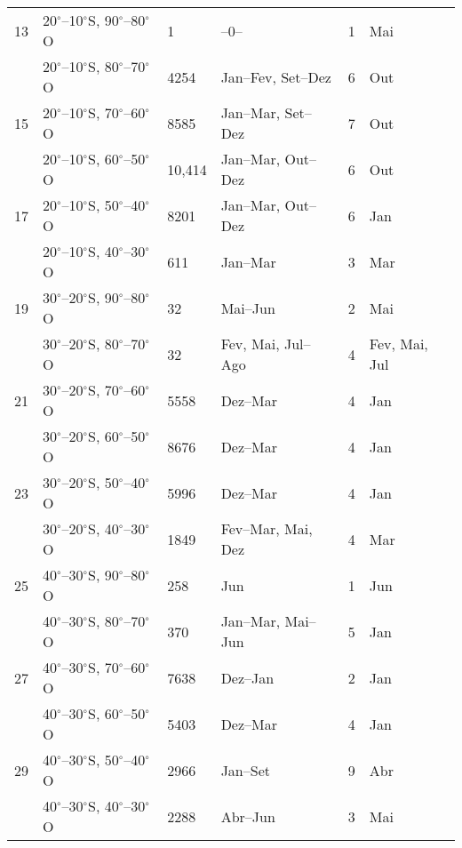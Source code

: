 \begin{table}[!ht]
\begin{tabularx}{\textwidth}{p{0.6cm} p{3.5cm} W W W W}
13&20$^{\circ}$--10$^{\circ}$S, 90$^{\circ}$--80$^{\circ}$O& 1  &   --0--  & 1 & Mai \\[1.5pt]&20$^{\circ}$--10$^{\circ}$S, 80$^{\circ}$--70$^{\circ}$O& 4254 & Jan--Fev,  Set--Dez  &6& Out\\[1.5pt]
15&20$^{\circ}$--10$^{\circ}$S, 70$^{\circ}$--60$^{\circ}$O& 8585 & Jan--Mar, Set--Dez &7& Out\\[1.5pt]&20$^{\circ}$--10$^{\circ}$S, 60$^{\circ}$--50$^{\circ}$O& 10,414 & Jan--Mar,  Out--Dez &6& Out\\[1.5pt]
17&20$^{\circ}$--10$^{\circ}$S, 50$^{\circ}$--40$^{\circ}$O& 8201 & Jan--Mar, Out--Dez &6&  Jan\\[1.5pt]&20$^{\circ}$--10$^{\circ}$S, 40$^{\circ}$--30$^{\circ}$O& 611 & Jan--Mar &3&  Mar\\[1.5pt]

19&30$^{\circ}$--20$^{\circ}$S, 90$^{\circ}$--80$^{\circ}$O& 32 & Mai--Jun &2&  Mai\\[1.5pt]&30$^{\circ}$--20$^{\circ}$S, 80$^{\circ}$--70$^{\circ}$O& 32 & Fev, Mai, Jul--Ago &4&  Fev, Mai,  Jul\\[1.5pt]
21&30$^{\circ}$--20$^{\circ}$S, 70$^{\circ}$--60$^{\circ}$O& 5558 & Dez--Mar &4& Jan\\[1.5pt]&30$^{\circ}$--20$^{\circ}$S, 60$^{\circ}$--50$^{\circ}$O& 8676 & Dez--Mar &4& Jan\\[1.5pt]
23&30$^{\circ}$--20$^{\circ}$S, 50$^{\circ}$--40$^{\circ}$O& 5996 & Dez--Mar &4& Jan\\[1.5pt]&30$^{\circ}$--20$^{\circ}$S, 40$^{\circ}$--30$^{\circ}$O& 1849 & Fev--Mar, Mai, Dez &4&  Mar\\[1.5pt]

25&40$^{\circ}$--30$^{\circ}$S, 90$^{\circ}$--80$^{\circ}$O& 258 & Jun &1&  Jun \\[1.5pt]&40$^{\circ}$--30$^{\circ}$S, 80$^{\circ}$--70$^{\circ}$O& 370 & Jan--Mar, Mai--Jun &5&  Jan\\[1.5pt]
27&40$^{\circ}$--30$^{\circ}$S, 70$^{\circ}$--60$^{\circ}$O& 7638 & Dez--Jan &2&  Jan\\[1.5pt]&40$^{\circ}$--30$^{\circ}$S, 60$^{\circ}$--50$^{\circ}$O& 5403 & Dez--Mar &4&  Jan\\[1.5pt]
29&40$^{\circ}$--30$^{\circ}$S, 50$^{\circ}$--40$^{\circ}$O& 2966 & Jan--Set &9&  Abr\\[1.5pt]&40$^{\circ}$--30$^{\circ}$S, 40$^{\circ}$--30$^{\circ}$O& 2288 & Abr--Jun  &3& Mai\\[1.5pt]


\hline 
\end{tabularx}
\end{table}

